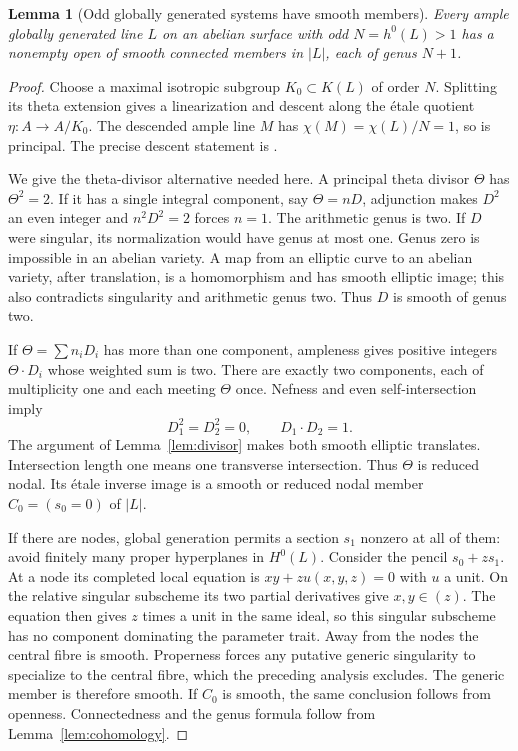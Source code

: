 \documentclass[11pt]{article}
\newtheorem{lemma}[theorem]{Lemma}
\theoremstyle{definition}\newtheorem{definition}[theorem]{Definition}
\theoremstyle{remark}\newtheorem{remark}[theorem]{Remark}
\begin{document}
\begin{lemma}[Odd globally generated systems have smooth members]\label{lem:smooth}
Every ample globally generated line $L$ on an abelian surface with odd $N=h^0(L)>1$ has a nonempty open of smooth connected members in $|L|$, each of genus $N+1$.
\end{lemma}
\begin{proof}
Choose a maximal isotropic subgroup $K_0\subset K(L)$ of order $N$. Splitting its theta extension gives a linearization and descent along the \'etale quotient $\eta:A\to A/K_0$. The descended ample line $M$ has $\chi(M)=\chi(L)/N=1$, so is principal. The precise descent statement is \citet[Theorem~8.10 and Corollary~8.11, pp.~116--117]{EGM}.

We give the theta-divisor alternative needed here. A principal theta divisor $\Theta$ has $\Theta^2=2$. If it has a single integral component, say $\Theta=nD$, adjunction makes $D^2$ an even integer and $n^2D^2=2$ forces $n=1$. The arithmetic genus is two. If $D$ were singular, its normalization would have genus at most one. Genus zero is impossible in an abelian variety. A map from an elliptic curve to an abelian variety, after translation, is a homomorphism and has smooth elliptic image; this also contradicts singularity and arithmetic genus two. Thus $D$ is smooth of genus two.

If $\Theta=\sum n_iD_i$ has more than one component, ampleness gives positive integers $\Theta\cdot D_i$ whose weighted sum is two. There are exactly two components, each of multiplicity one and each meeting $\Theta$ once. Nefness and even self-intersection imply
\[
 D_1^2=D_2^2=0,\qquad D_1\cdot D_2=1.
\]
The argument of Lemma~\ref{lem:divisor} makes both smooth elliptic translates. Intersection length one means one transverse intersection. Thus $\Theta$ is reduced nodal. Its \'etale inverse image is a smooth or reduced nodal member $C_0=(s_0=0)$ of $|L|$.

If there are nodes, global generation permits a section $s_1$ nonzero at all of them: avoid finitely many proper hyperplanes in $H^0(L)$. Consider the pencil $s_0+z s_1$. At a node its completed local equation is $xy+z u(x,y,z)=0$ with $u$ a unit. On the relative singular subscheme its two partial derivatives give $x,y\in(z)$. The equation then gives $z$ times a unit in the same ideal, so this singular subscheme has no component dominating the parameter trait. Away from the nodes the central fibre is smooth. Properness forces any putative generic singularity to specialize to the central fibre, which the preceding analysis excludes. The generic member is therefore smooth. If $C_0$ is smooth, the same conclusion follows from openness. Connectedness and the genus formula follow from Lemma~\ref{lem:cohomology}.
\end{proof}
\end{document}
